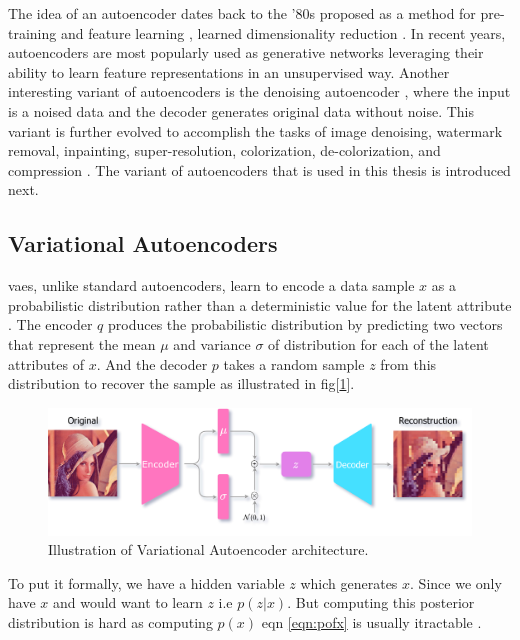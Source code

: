 The idea of an autoencoder dates back to the '80s proposed as a method for pre-training and feature learning \cite{ballard1987modular, rumelhart1985learning}, learned dimensionality reduction \cite{hinton_dimentionality}. In recent years, autoencoders are most popularly used as generative networks leveraging their ability to learn feature representations in an unsupervised way. Another interesting variant of autoencoders is the denoising autoencoder \cite{vincent2008extracting}, where the input is a noised data and the decoder generates original data without noise. This variant is further evolved to accomplish the tasks of image denoising, watermark removal, inpainting, super-resolution, colorization, de-colorization, and compression \cite{zhang2016colorful, imagedenoisingpaper}. The variant of autoencoders that is used in this thesis is introduced next.

\subsection{Variational Autoencoders}
\acp{vae}, unlike standard autoencoders, learn to encode a data sample $x$ as a probabilistic distribution rather than a deterministic value for the latent attribute \cite{jeremy_jordan_2018}. The encoder $q$ produces the probabilistic distribution by predicting two vectors that represent the mean $\mu$ and variance $\sigma$ of distribution for each of the latent attributes of $x$. And the decoder $p$ takes a random sample $z$ from this distribution to recover the sample as illustrated in fig[\ref{fig:vae_arch}].

\begin{figure}[!h]
    \centering
    \includegraphics[scale=0.2]{figures/vae_arch.png}
    \caption{Illustration of Variational Autoencoder architecture.}
    \label{fig:vae_arch}
\end{figure}

To put it formally, we have a hidden variable $z$ which generates $x$. Since we only have $x$ and would want to learn $z$ i.e $p(z | x)$. But computing this posterior distribution is hard as computing $p(x)$ eqn \ref{eqn:pofx} is usually itractable \cite{kingma2013autoencoding}.

